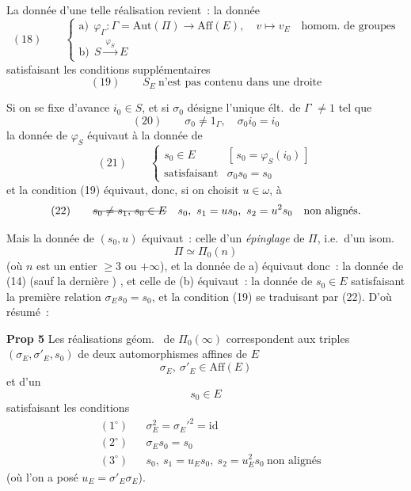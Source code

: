 \documentclass[11pt,a4paper]{article}
\begin{document}
 La donnée d'une telle réalisation revient~: la donnée
\[
  (18)\qquad
  \begin{cases}
    \text{a)}\ \ \varphi_\Gamma : \Gamma = \mathrm{Aut}(\Pi) \longrightarrow \mathrm{Aff}(E),
      \quad v \longmapsto v_E \quad \text{homom.\ de groupes} \\
    \text{b)}\ \ S \xrightarrow{\ \varphi_S\ } E
  \end{cases}
\]
 satisfaisant les  conditions supplémentaires
\[
  (19)\qquad S_E \ \text{n'est pas contenu dans une droite}
\]

Si on se fixe d'avance $i_0 \in S$, et si $\sigma_0$ désigne l'unique élt.\ de $\Gamma$ $\neq 1$ tel que 
\[
  (20)\qquad \sigma_0 \neq 1_\Gamma , \quad \sigma_0 i_0 = i_0
\]
la donnée de $\varphi_S$ équivaut  à la donnée de
\[
  (21)\qquad
  \begin{cases}
    s_0 \in E & [\, s_0 = \varphi_S(i_0) \,] \\
    \text{satisfaisant} & \sigma_0 s_0 = s_0
  \end{cases}
\]
et la condition (19) équivaut, donc, \struck{\ill{}} si on choisit $u \in \omega$, à
\[
  (22)\qquad \text{\struck{$s_0 \neq s_1$, $s_0 \in E$}} \quad
  s_0,\ s_1 = u s_0,\ s_2 = u^{2} s_0 \quad \text{non alignés.}
\]

Mais la donnée de $(s_0, u)$ équivaut~: celle d'un \emph{épinglage} de $\Pi$, i.e.\ d'un  isom.
\[
  \Pi \simeq \Pi_0(n)
\]
(où $n$ \struck{\ill{}} est un entier $\geq 3$ ou $+\infty$), et la donnée de a)  équivaut donc~: la donnée de (14) (sauf la dernière ) , et celle de (b) équivaut~: la donnée de $s_0 \in E$ satisfaisant la première relation $\sigma_E s_0 = s_0$, et la condition (19) se traduisant par (22). D'où résumé~:

\textbf{Prop 5} Les  réalisations géom.\   de $\Pi_0(\infty)$ correspondent aux  triples $(\sigma_E, \sigma'_E, s_0)$ de deux automorphismes affines  de $E$
\[
  \sigma_E,\ \sigma'_E \in \mathrm{Aff}(E)
\]
et d'un 
\[
  s_0 \in E
\]
satisfaisant les conditions
\begin{align*}
  &(1^{\circ}) && \sigma_E^{2} = \sigma_E'^{2} = \mathrm{id} \\
  &(2^{\circ}) && \sigma_E s_0 = s_0 \\
  &(3^{\circ}) && s_0,\ s_1 = u_E s_0,\ s_2 = u_E^{2} s_0 \ \text{non alignés}
\end{align*}
(où l'on a posé $u_E = \sigma'_E \sigma_E$).
\end{document}

